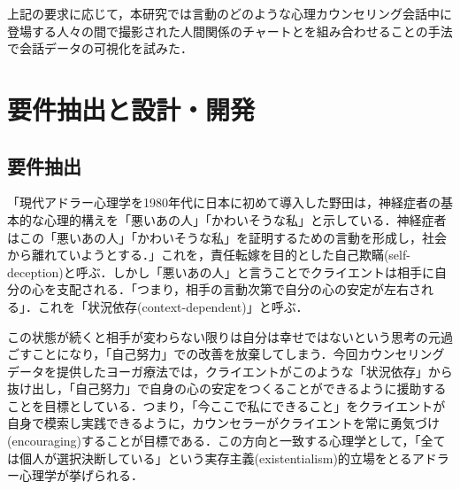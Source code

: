 \documentclass[shuuron]{kuee}
\begin{document}
上記の要求に応じて，本研究では言動のどのような心理カウンセリング会話中に登場する人々の間で撮影された人間関係のチャートとを組み合わせることの手法で会話データの可視化を試みた．

\section{要件抽出と設計・開発}

%

\subsection{要件抽出}


「現代アドラー心理学を1980年代に日本に初めて導入した野田\cite{zokad}は，神経症者の基本的な心理的構えを「悪いあの人」「かわいそうな私」と示している．神経症者はこの「悪いあの人」「かわいそうな私」を証明するための言動を形成し，社会から離れていようとする．」これを，責任転嫁を目的とした自己欺瞞(self-deception)と呼ぶ\cite{Darshana}．しかし「悪いあの人」と言うことでクライエントは相手に自分の心を支配される．「つまり，相手の言動次第で自分の心の安定が左右される」．これを「状況依存(context-dependent)」と呼ぶ．

この状態が続くと相手が変わらない限りは自分は幸せではないという思考の元過ごすことになり，「自己努力」での改善を放棄してしまう．今回カウンセリングデータを提供したヨーガ療法では，クライエントがこのような「状況依存」から抜け出し，「自己努力」で自身の心の安定をつくることができるように援助することを目標としている．つまり，「今ここで私にできること」をクライエントが自身で模索し実践できるように，カウンセラーがクライエントを常に勇気づけ(encouraging)することが目標である．この方向と一致する心理学として，「全ては個人が選択決断している」という実存主義(existentialism)的立場をとるアドラー心理学が挙げられる．
\end{document}
